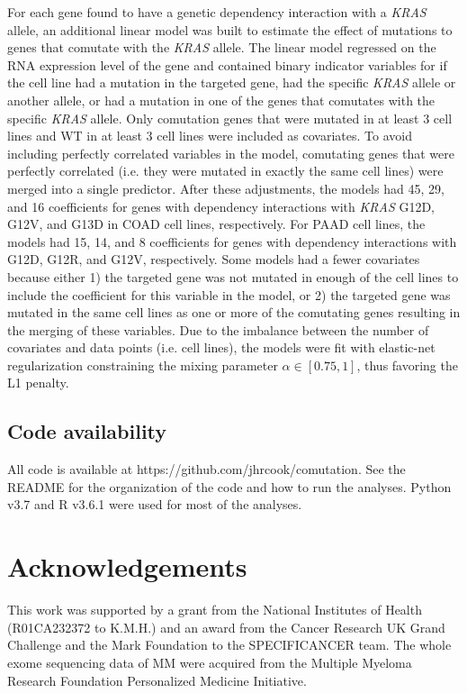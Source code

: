 \documentclass[english, 10pt, letterpaper]{article}
\newcommand{\KRAS}{\emph{KRAS}}
\begin{document}
For each gene found to have a genetic dependency interaction with a \KRAS{} allele, an additional linear model was built to estimate the effect of mutations to genes that comutate with the \KRAS{} allele.
The linear model regressed on the RNA expression level of the gene and contained binary indicator variables for if the cell line had a mutation in the targeted gene, had the specific \KRAS{} allele or another allele, or had a mutation in one of the genes that comutates with the specific \KRAS{} allele.
Only comutation genes that were mutated in at least 3 cell lines and WT in at least 3 cell lines were included as covariates.
To avoid including perfectly correlated variables in the model, comutating genes that were perfectly correlated (i.e. they were mutated in exactly the same cell lines) were merged into a single predictor.
After these adjustments, the models had 45, 29, and 16 coefficients for genes with dependency interactions with \KRAS{} G12D, G12V, and G13D in COAD cell lines, respectively.
For PAAD cell lines, the models had 15, 14, and 8 coefficients for genes with dependency interactions with G12D, G12R, and G12V, respectively.
Some models had a fewer covariates because either 1) the targeted gene was not mutated in enough of the cell lines to include the coefficient for this variable in the model, or 2) the targeted gene was mutated in the same cell lines as one or more of the comutating genes resulting in the merging of these variables.
Due to the imbalance between the number of covariates and data points (i.e. cell lines), the models were fit with elastic-net regularization \cite{Zou2005RegularizationNet, R-caret} constraining the mixing parameter $\alpha \in [0.75, 1]$, thus favoring the L1 penalty.


\subsection*{Code availability}

All code is available at https://github.com/jhrcook/comutation.
See the README for the organization of the code and how to run the analyses.
Python v3.7 \cite{van1995python} and R v3.6.1 \cite{Rlang} were used for most of the analyses.



\section*{Acknowledgements}

This work was supported by a grant from the National Institutes of Health (R01CA232372 to K.M.H.) and an award from the Cancer Research UK Grand Challenge and the Mark Foundation to the SPECIFICANCER team. 
The whole exome sequencing data of MM were acquired from the Multiple Myeloma Research Foundation Personalized Medicine Initiative.
\end{document}
